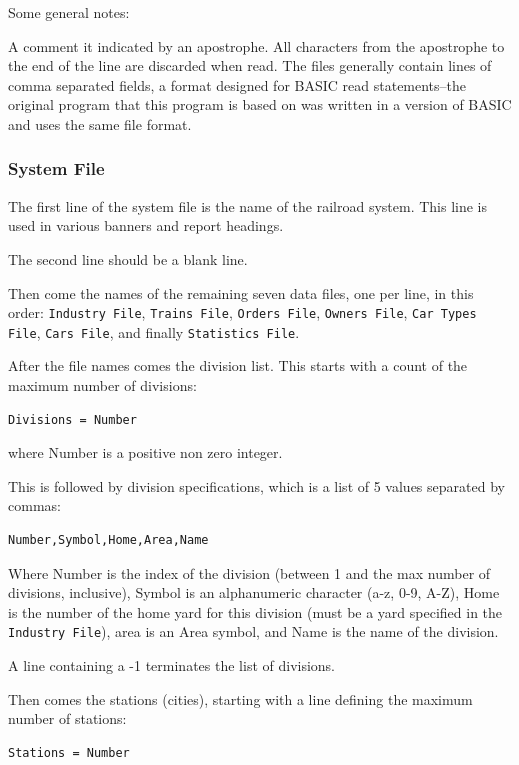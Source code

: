 Some general notes:

A comment it indicated by an apostrophe.  All characters from the
apostrophe to the end of the line are discarded when read.  The files
generally contain lines of comma separated fields, a format
designed for BASIC read statements--the original program that this
program is based on was written in a version of BASIC and uses the same
file format.

\subsubsection{System File}

The first line of the system file is the name of the railroad system. 
This line is used in various banners and report headings.

The second line should be a blank line.

Then come the names of the remaining seven data files, one per line, in
this order: \verb=Industry File=, \verb=Trains File=, \verb=Orders File=, 
\verb=Owners File=, \verb=Car Types File=, \verb=Cars File=, and finally 
\verb=Statistics File=. 

After the file names comes the division list.  This starts with a count
of the maximum number of divisions:

\begin{verbatim}
Divisions = Number
\end{verbatim}

where Number is a positive non zero integer.

This is followed by division specifications, which is a list of 5 values
separated by commas:

\begin{verbatim}
Number,Symbol,Home,Area,Name
\end{verbatim}

Where Number is the index of the division (between 1 and the max number
of divisions, inclusive), Symbol is an alphanumeric character (a-z, 0-9,
A-Z), Home is the number of the home yard for this division (must be a
yard specified in the \verb=Industry File=), area is an Area symbol, and
Name is the name of the division.

A line containing a -1 terminates the list of divisions.

Then comes the stations (cities), starting with a line defining the maximum
number of stations:

\begin{verbatim}
Stations = Number
\end{verbatim}


